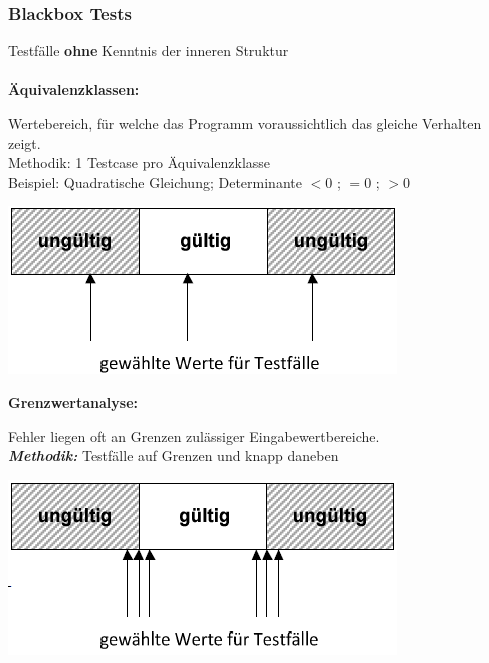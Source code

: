 \subsubsection{Blackbox Tests}
Testfälle \textbf{ohne} Kenntnis der inneren Struktur\\\\
\textbf{Äquivalenzklassen:} \\
\begin{minipage}{10cm}
Wertebereich, für welche das Programm voraussichtlich das gleiche Verhalten zeigt. \\
Methodik: 1 Testcase pro Äquivalenzklasse \\
Beispiel: Quadratische Gleichung; Determinante $<0$ ; $=0$ ; $>0$ \\
\vspace{2cm}
\end{minipage}
\begin{minipage}{5cm}
	\includegraphics[width=\linewidth]{images/aequivalenzklasse.png}
\end{minipage}

\textbf{Grenzwertanalyse:} \\
\begin{minipage}{10cm}
Fehler liegen oft an Grenzen zulässiger Eingabewertbereiche. \\
\textit{\textbf{Methodik:}} Testfälle auf Grenzen und knapp daneben \\
\vspace{2cm}
\end{minipage}
\begin{minipage}{5cm}
	\includegraphics[width=\linewidth]{images/grenzwertanalyse.png}
\end{minipage}

